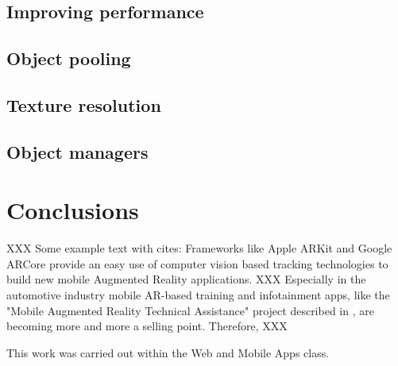 \documentclass[sigconf]{acmart}
\begin{document}
\subsection{Improving performance}

\subsection{Object pooling}

\subsection{Texture resolution}

\subsection{Object managers}

\section{Conclusions}
XXX Some example text with cites: 
Frameworks like Apple ARKit \cite{ARKit} and Google ARCore \cite{ARCore} provide an easy use of
computer vision based tracking technologies to build new mobile Augmented Reality applications.
XXX Especially in the automotive industry mobile AR-based training and infotainment apps, like 
the "Mobile Augmented Reality Technical Assistance" project described in \cite{Stanimirovic14}, 
are becoming more and more a selling point. Therefore, XXX
%
%
%
%
%
\begin{acks}
This work was carried out within the Web and Mobile Apps class.
\end{acks}



\end{document}
